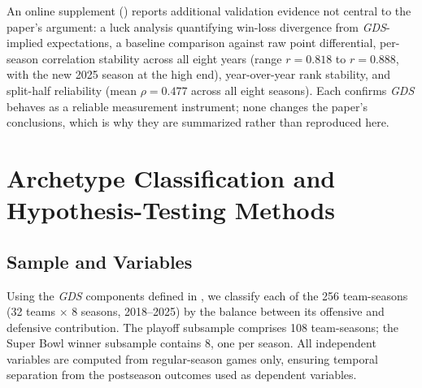 \documentclass[12pt,a4paper]{article}
\newcommand{\gds}{\textit{GDS}}
\begin{document}
An online supplement () reports additional validation evidence not central to the paper's argument: a luck analysis quantifying win-loss divergence from \gds{}-implied expectations, a baseline comparison against raw point differential, per-season correlation stability across all eight years (range $r=0.818$ to $r=0.888$, with the new 2025 season at the high end), year-over-year rank stability, and split-half reliability (mean $\rho = 0.477$ across all eight seasons). Each confirms \gds{} behaves as a reliable measurement instrument; none changes the paper's conclusions, which is why they are summarized rather than reproduced here.

\section{Archetype Classification and Hypothesis-Testing Methods}
\label{sec:methods}

\subsection{Sample and Variables}
\label{sec:sample}

Using the \gds{} components defined in , we classify each of the 256 team-seasons (32 teams $\times$ 8 seasons, 2018--2025) by the balance between its offensive and defensive contribution. The playoff subsample comprises 108 team-seasons; the Super Bowl winner subsample contains 8, one per season. All independent variables are computed from regular-season games only, ensuring temporal separation from the postseason outcomes used as dependent variables.
\end{document}
